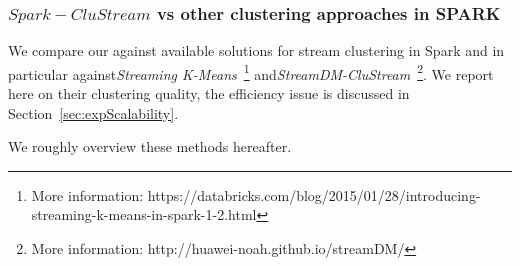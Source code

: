 \subsubsection{$Spark-CluStream$ vs other clustering approaches in SPARK}
\label{sec:expQuality-vs-SPARK}
We compare our \our against available solutions for stream clustering in Spark and in particular against\textit{Streaming K-Means}~\footnote{More information: https://databricks.com/blog/2015/01/28/introducing-streaming-k-means-in-spark-1-2.html} and\textit{StreamDM-CluStream}~\footnote{More information: http://huawei-noah.github.io/streamDM/}.
We report here on their clustering quality, the efficiency issue is discussed in Section~\ref{sec:expScalability}.

We roughly overview these methods hereafter.



